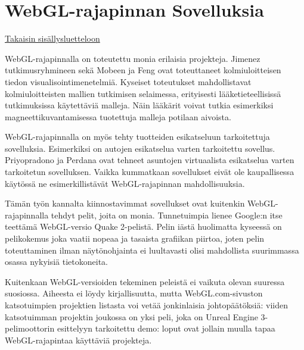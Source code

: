 \section{WebGL-rajapinnan Sovelluksia}
\label{sec:sovelluksia}
\hyperlink{index}{Takaisin sisällysluetteloon}

WebGL-rajapinnalla on toteutettu monia erilaisia projekteja. Jimenez tutkimusryhmineen\cite{biomed} sekä Mobeen ja Feng\cite{volumerendering} ovat toteuttaneet kolmiuloitteisen tiedon visualisointimenetelmiä. Kyseiset toteutukset mahdollistavat kolmiuloitteisten mallien tutkimisen selaimessa, erityisesti lääketieteellisissä tutkimuksissa käytettäviä malleja. Näin lääkärit voivat tutkia esimerkiksi magneettikuvantamisessa tuotettuja malleja potilaan aivoista.

WebGL-rajapinnalla on myös tehty tuotteiden esikatseluun tarkoitettuja sovelluksia. Esimerkiksi \cite{3dcar} on autojen esikatselua varten tarkoitettu sovellus. Priyopradono ja Perdana\cite{housepreview} ovat tehneet asuntojen virtuaalista esikatselua varten tarkoitetun sovelluksen. Vaikka kummatkaan sovellukset eivät ole kaupallisessa käytössä ne esimerkillistävät WebGL-rajapinnan mahdollisuuksia.

Tämän työn kannalta kiinnostavimmat sovellukset ovat kuitenkin WebGL-rajapinnalla tehdyt pelit, joita on monia\cite{webglgames}. Tunnetuimpia lienee Google:n itse teettämä WebGL-versio Quake 2-pelistä\cite{quakewebgl}. Pelin iästä huolimatta kyseessä on pelikokemus joka vaatii nopeaa ja tasaista grafiikan piirtoa, joten pelin toteuttaminen ilman näytönohjainta ei luultavasti olisi mahdollista suurimmassa osassa nykyisiä tietokoneita. 

Kuitenkaan WebGL-versioiden tekeminen peleistä ei vaikuta olevan suuressa suosiossa. Aiheesta ei löydy kirjallisuutta, mutta WebGL.com-sivuston katsotuimpien projektien listasta\cite{webglgames} voi vetää jonkinlaisia johtopäätöksiä: viiden katsotuimman projektin joukossa on yksi peli, joka on Unreal Engine 3-pelimoottorin esittelyyn tarkoitettu demo\cite{epicwebgl}: loput ovat jollain muulla tapaa WebGL-rajapintaa käyttäviä projekteja.